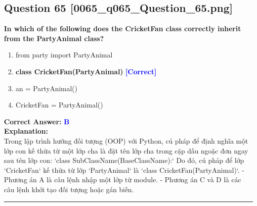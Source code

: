 \documentclass[11pt,a4paper]{article}
\begin{document}
\begin{minipage}{\textwidth}
\subsection*{Question 65 \quad \footnotesize{[0065_q065_Question_65.png]}}
\noindent \textbf{In which of the following does the CricketFan class correctly inherit from the PartyAnimal class?}

\begin{enumerate}[label=\Alph*.]
    \item from party import PartyAnimal
    \item \textbf{class CricketFan(PartyAnimal)} \hfill \textcolor{blue}{\textbf{[Correct]}}
    \item an = PartyAnimal()
    \item CricketFan = PartyAnimal()
\end{enumerate}

\noindent \textbf{Correct Answer:} \textcolor{blue}{\textbf{B}} \\[4pt]
\noindent \textbf{Explanation:}\\
Trong lập trình hướng đối tượng (OOP) với Python, cú pháp để định nghĩa một lớp con kế thừa từ một lớp cha là đặt tên lớp cha trong cặp dấu ngoặc đơn ngay sau tên lớp con:\newline
`class SubClassName(BaseClassName):`\newline
Do đó, cú pháp để lớp `CricketFan` kế thừa từ lớp `PartyAnimal` là `class CricketFan(PartyAnimal)`.\newline
\newline
- Phương án A là câu lệnh nhập một lớp từ module.\newline
- Phương án C và D là các câu lệnh khởi tạo đối tượng hoặc gán biến.
\end{minipage}
\vspace{0.8cm}
\hrule
\vspace{0.5cm}
\end{document}
